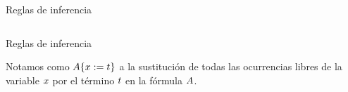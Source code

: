 \documentclass[xcolor={dvipsnames},spanish]{beamer}
\begin{document}
\begin{frame}{Reglas de inferencia}
    \begin{definition}
        \begin{columns}
            \begin{column}{0.5\textwidth}
                \proofTreeFalseE
                \proofTreeTrueI
                \proofTreeLEM
            \end{column}
            \begin{column}{0.5\textwidth}
                \proofTreeNotI
                \proofTreeNotE
                \proofTreeOrIOne
                \proofTreeOrITwo
            \end{column}
        \end{columns}
        \proofTreeOrE
    \end{definition}
\end{frame}

\begin{frame}{Reglas de inferencia}
    \begin{definition}[Sustitución]
        Notamos como $A \{x := t\}$ a la sustitución de todas las
        ocurrencias libres de la variable $x$ por el término $t$ en la
        fórmula $A$.
    \end{definition}
    \begin{definition}
        \begin{columns}
            \proofTreeForallI
            \proofTreeForallE
        \end{columns}
        \proofTreeExistsI
        \proofTreeExistsE
    \end{definition}
\end{frame}
\end{document}
